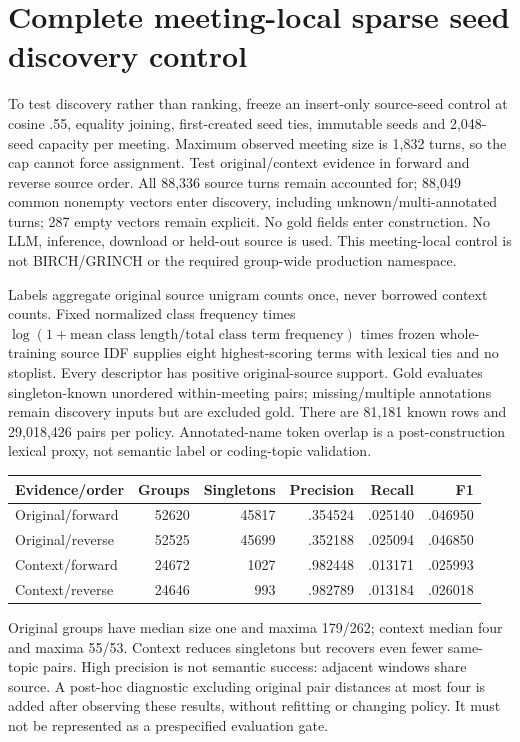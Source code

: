 \documentclass[11pt]{article}
\begin{document}
\section{Complete meeting-local sparse seed discovery control}
To test discovery rather than ranking, freeze an insert-only source-seed control
at cosine .55, equality joining, first-created seed ties, immutable seeds and
2,048-seed capacity per meeting. Maximum observed meeting size is 1,832 turns,
so the cap cannot force assignment. Test original/context evidence in forward
and reverse source order. All 88,336 source turns remain accounted for; 88,049
common nonempty vectors enter discovery, including unknown/multi-annotated
turns; 287 empty vectors remain explicit. No gold fields enter construction.
No LLM, inference, download or held-out source is used. This meeting-local
control is not BIRCH/GRINCH or the required group-wide production namespace.

Labels aggregate original source unigram counts once, never borrowed context
counts. Fixed normalized class frequency times
$\log(1+\text{mean class length}/\text{total class term frequency})$ times frozen
whole-training source IDF supplies eight highest-scoring terms with lexical ties
and no stoplist. Every descriptor has positive original-source support.
Gold evaluates singleton-known unordered within-meeting pairs; missing/multiple
annotations remain discovery inputs but are excluded gold. There are 81,181
known rows and 29,018,426 pairs per policy. Annotated-name token overlap is a
post-construction lexical proxy, not semantic label or coding-topic validation.

\begin{center}
\begin{tabular}{lrrrrr}
Evidence/order & Groups & Singletons & Precision & Recall & F1\\\hline
Original/forward & 52620 & 45817 & .354524 & .025140 & .046950\\
Original/reverse & 52525 & 45699 & .352188 & .025094 & .046850\\
Context/forward & 24672 & 1027 & .982448 & .013171 & .025993\\
Context/reverse & 24646 & 993 & .982789 & .013184 & .026018
\end{tabular}
\end{center}
Original groups have median size one and maxima 179/262; context median four
and maxima 55/53. Context reduces singletons but recovers even fewer same-topic
pairs. High precision is not semantic success: adjacent windows share source.
A post-hoc diagnostic excluding original pair distances at most four is added
after observing these results, without refitting or changing policy. It must
not be represented as a prespecified evaluation gate.
\end{document}
